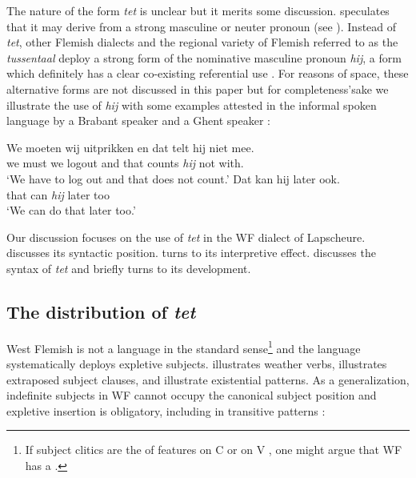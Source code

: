 \documentclass[output=paper]{LSP/langsci}
\begin{document}
The nature of the form \textit{tet} is unclear but it merits some discussion. \citet[209--210]{DeVogelaer2005} speculates that it may derive from a strong masculine or neuter pronoun (see \citealt{DeVogelaerEtAl2008}). Instead of \textit{tet}, other Flemish dialects and the regional variety of Flemish referred to as the \textit{tussentaal} \citep{CaluweEtAl2013} deploy a strong form of the nominative masculine pronoun \textit{hij}, a form which definitely has a clear co-existing referential use \citep{DeVogelaerEtAl2008,GuéronEtAl2012}. For reasons of space, these alternative forms are not discussed in this paper but for completeness’sake we illustrate the use of \textit{hij} with some examples attested in the informal spoken language by a Brabant speaker  and a Ghent speaker :

\ea%
    \label{ex:Greco:27}
	\ea \label{ex:Greco:27a} \gll We moeten wij uitprikken   en   dat   telt   hij niet mee.\\
         we must     we logout   and   that   counts \textit{hij} not with.\\
	\glt ‘We have to log out and that does not count.’
	\ex \label{ex:Greco:27b} \gll Dat kan hij later ook.\\
     that can \textit{hij} later too\\
    \glt `We can do that later too.'
    \z
\z

Our discussion focuses on the use of \textit{tet} in the WF dialect of Lapscheure.  discusses its syntactic position.  turns to its interpretive effect.  discusses the syntax of \textit{tet} and  briefly turns to its development.

\subsection{The distribution of \textit{tet}}\label{sec:Greco:5.1.}

West Flemish is not a  language in the standard sense\footnote{If subject clitics are the  of  features on C or on V \citep{BennisEtAl1984}, one might argue that WF has a .} and the language systematically deploys expletive subjects.  illustrates weather verbs,  illustrates extraposed subject clauses,  and  illustrate existential patterns. As a generalization, indefinite subjects in WF cannot occupy the canonical subject position and expletive insertion is obligatory, including in transitive patterns :
\end{document}
